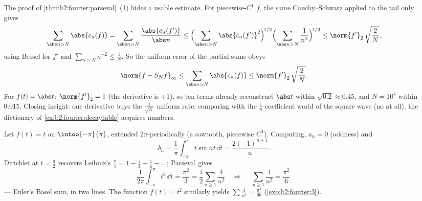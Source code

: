 \begin{example}\label{ex:b2:fourier:tailbound}
The proof of \cref{thm:b2:fourier:parseval}~(1) hides a usable
estimate. For  piecewise-$C^1$ $f$, the same
Cauchy--Schwarz applied to the tail only gives
\[
\sum_{\abs n > N}\abs{c_n(f)}
= \sum_{\abs n > N}\frac{\abs{c_n(f')}}{\abs n}
\leq \Bigl(\sum_{\abs n > N}\abs{c_n(f')}^2\Bigr)^{\!1/2}
\Bigl(\sum_{\abs n>N}\frac{1}{n^2}\Bigr)^{\!1/2}
\leq \norm{f'}_2\,\sqrt{\frac{2}{N}} ,
\]
using Bessel for $f'$ and $\sum_{n>N}n^{-2} \leq \frac1N$. So
the uniform error of the partial sums obeys
\[
\norm{f - S_Nf}_\infty
\leq \sum_{\abs n>N}\abs{c_n(f)}
\leq \norm{f'}_2\,\sqrt{\frac2N} .
\]
For $f(t) = \abs t$: $\norm{f'}_2 = 1$ (the derivative is
$\pm1$), so ten terms already reconstruct $\abs t$ 
within $\sqrt{0.2} \approx 0.45$, and $N = 10^4$ within
$0.015$. Closing insight: one derivative buys the
$\frac{1}{\sqrt N}$ uniform rate; comparing with the
$\frac1n$-coefficient world of the square wave (no  at all), the dictionary of
\cref{ex:b2:fourier:decaytable} acquires numbers.
\end{example}

\begin{example}\label{ex:b2:fourier:basel}
Let $f(t) = t$ on $\intoo{-\pi}{\pi}$, extended $2\pi$-periodically
(a sawtooth, piecewise $C^1$). Computing, $a_n = 0$ (oddness) and
\[
b_n = \frac{1}{\pi}\int_{-\pi}^{\pi} t\sin nt\,\dd t
= \frac{2(-1)^{n+1}}{n} .
\]
Dirichlet at $t = \frac\pi2$ recovers Leibniz's $\frac\pi4 = 1 -
\frac13 + \frac15 - \dots$; Parseval gives
\[
\frac{1}{2\pi}\int_{-\pi}^{\pi} t^2\,\dd t = \frac{\pi^2}{3}
= \frac12\sum_{n\geq1}\frac{4}{n^2}
\quad\Longrightarrow\quad
\boxed{\;\sum_{n\geq1}\frac{1}{n^2} = \frac{\pi^2}{6}\;}
\]
--- Euler's Basel sum, in two lines. The function $f(t) = t^2$
similarly yields $\sum \frac1{n^4} = \frac{\pi^4}{90}$
(\cref{exo:b2:fourier:3}).
\end{example}

